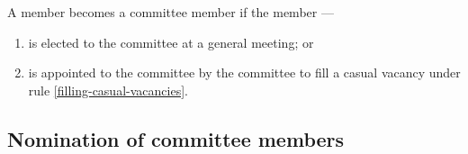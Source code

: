 \documentclass[../constitution.tex]{subfiles}
\begin{document}
A member becomes a committee member if the member ---

\begin{enumerate}

\item is elected to the committee at a general meeting; or
\item is appointed to the committee by the committee to fill a casual vacancy under rule \ref{filling-casual-vacancies}.
\end{enumerate}

\hypertarget{nomination-of-committee-members}{%
\subsection{Nomination of committee members}\label{nomination-of-committee-members}}
\end{document}
